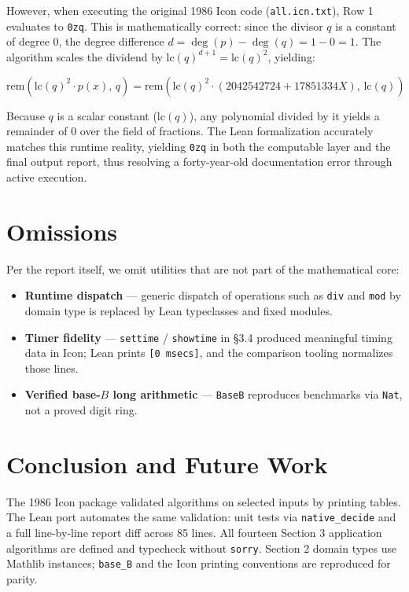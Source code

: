 \documentclass[11pt,a4paper]{article}
\begin{document}
However, when executing the original 1986 Icon code (\texttt{all.icn.txt}), Row 1 evaluates to \texttt{0zq}. This is mathematically correct: since the divisor $q$ is a constant of degree 0, the degree difference $d = \deg(p) - \deg(q) = 1 - 0 = 1$. The algorithm scales the dividend by $\mathrm{lc}(q)^{d+1} = \mathrm{lc}(q)^2$, yielding:

$$\mathrm{rem}(\mathrm{lc}(q)^2 \cdot p(x),\, q) = \mathrm{rem}(\mathrm{lc}(q)^2 \cdot (2042542724 + 17851334 X),\, \mathrm{lc}(q))$$

Because $q$ is a scalar constant ($\mathrm{lc}(q)$), any polynomial divided by it yields a remainder of 0 over the field of fractions. The Lean formalization accurately matches this runtime reality, yielding \texttt{0zq} in both the computable layer and the final output report, thus resolving a forty-year-old documentation error through active execution.

\section{Omissions}
Per the report itself, we omit utilities that are not part of the mathematical core:
\begin{itemize}
    \item \textbf{Runtime dispatch} --- generic dispatch of operations such as \texttt{div} and \texttt{mod} by domain type is replaced by Lean typeclasses and fixed modules.
    \item \textbf{Timer fidelity} --- \texttt{settime} / \texttt{showtime} in \S3.4 produced meaningful timing data in Icon; Lean prints \texttt{[0 msecs]}, and the comparison tooling normalizes those lines.
    \item \textbf{Verified base-$B$ long arithmetic} --- \texttt{BaseB} reproduces benchmarks via \texttt{Nat}, not a proved digit ring.
\end{itemize}

\section{Conclusion and Future Work}
The 1986 Icon package validated algorithms on selected inputs by printing tables. The Lean port automates the same validation: unit tests via \texttt{native\_decide} and a full line-by-line report diff across 85 lines. All fourteen Section 3 application algorithms are defined and typecheck without \texttt{sorry}. Section 2 domain types use Mathlib instances; \texttt{base\_B} and the Icon printing conventions are reproduced for parity.
\end{document}
